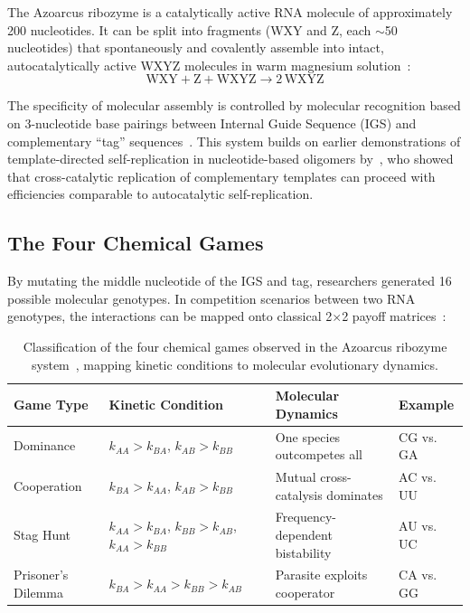 \documentclass[12pt,a4paper]{article}
\theoremstyle{remark}
\begin{document}
The Azoarcus ribozyme is a catalytically active RNA molecule of approximately 200 nucleotides. It can be split into fragments (WXY and Z, each $\sim$50 nucleotides) that spontaneously and covalently assemble into intact, autocatalytically active WXYZ molecules in warm magnesium solution~\citep{AzoarcusPMC}:
\begin{equation}
\text{WXY} + \text{Z} + \text{WXYZ} \longrightarrow 2\,\text{WXYZ}
\end{equation}

The specificity of molecular assembly is controlled by molecular recognition based on 3-nucleotide base pairings between Internal Guide Sequence (IGS) and complementary ``tag'' sequences~\citep{AzoarcusPNAS}. This system builds on earlier demonstrations of template-directed self-replication in nucleotide-based oligomers by~\citet{SieversKiedrowski1994}, who showed that cross-catalytic replication of complementary templates can proceed with efficiencies comparable to autocatalytic self-replication.

\subsection{The Four Chemical Games}

By mutating the middle nucleotide of the IGS and tag, researchers generated 16 possible molecular genotypes. In competition scenarios between two RNA genotypes, the interactions can be mapped onto classical 2$\times$2 payoff matrices~\citep{AzoarcusPMC}:

\begin{table}[htbp]
\centering
\caption{Classification of the four chemical games observed in the Azoarcus ribozyme system~\citep{AzoarcusPMC}, mapping kinetic conditions to molecular evolutionary dynamics.}
\label{tab:chemical-games}
\setlength{\tabcolsep}{4pt}
\begin{tabularx}{\textwidth}{@{}>{\raggedright\arraybackslash}p{}>{\raggedright\arraybackslash}p{}>{\raggedright\arraybackslash}X>{\raggedright\arraybackslash}p{}@{}}
\toprule
\textbf{Game Type} & \textbf{Kinetic Condition} & \textbf{Molecular Dynamics} & \textbf{Example} \\
\midrule
Dominance & $k_{AA} > k_{BA}$, $k_{AB} > k_{BB}$ & One species outcompetes all & CG vs. GA \\
Cooperation & $k_{BA} > k_{AA}$, $k_{AB} > k_{BB}$ & Mutual cross-catalysis dominates & AC vs. UU \\
Stag Hunt & $k_{AA} > k_{BA}$, $k_{BB} > k_{AB}$, $k_{AA} > k_{BB}$ & Frequency-dependent bistability & AU vs. UC \\
Prisoner's Dilemma & $k_{BA} > k_{AA} > k_{BB} > k_{AB}$ & Parasite exploits cooperator & CA vs. GG \\
\bottomrule
\end{tabularx}
\end{table}
\end{document}
